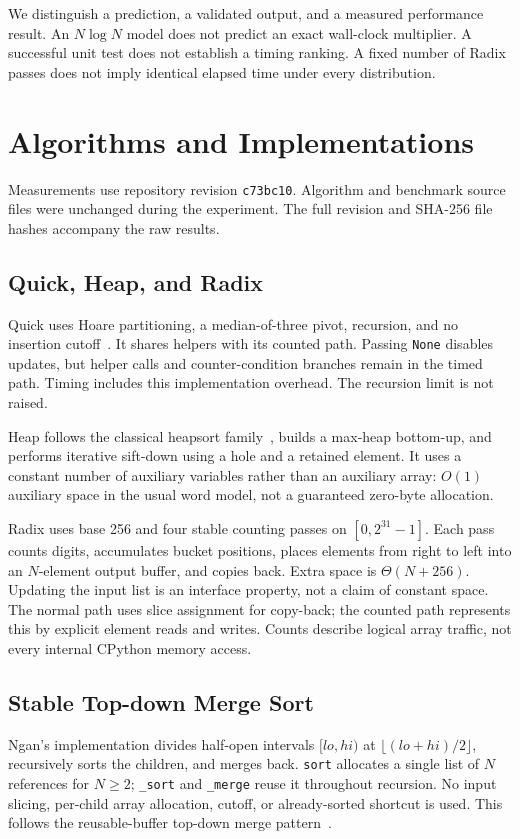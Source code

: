 \documentclass[conference]{IEEEtran}
\begin{document}
We distinguish a prediction, a validated output, and a measured performance result. An $N\log N$ model does not predict an exact wall-clock multiplier. A successful unit test does not establish a timing ranking. A fixed number of Radix passes does not imply identical elapsed time under every distribution.

\section{Algorithms and Implementations}
Measurements use repository revision \texttt{c73bc10}. Algorithm and benchmark source files were unchanged during the experiment. The full revision and SHA-256 file hashes accompany the raw results.

\subsection{Quick, Heap, and Radix}
Quick uses Hoare partitioning, a median-of-three pivot, recursion, and no insertion cutoff~\cite{hoare}. It shares helpers with its counted path. Passing \texttt{None} disables updates, but helper calls and counter-condition branches remain in the timed path. Timing includes this implementation overhead. The recursion limit is not raised.

Heap follows the classical heapsort family~\cite{williams}, builds a max-heap bottom-up, and performs iterative sift-down using a hole and a retained element. It uses a constant number of auxiliary variables rather than an auxiliary array: $O(1)$ auxiliary space in the usual word model, not a guaranteed zero-byte allocation.

Radix uses base 256 and four stable counting passes on $[0,2^{31}-1]$. Each pass counts digits, accumulates bucket positions, places elements from right to left into an $N$-element output buffer, and copies back. Extra space is $\Theta(N+256)$. Updating the input list is an interface property, not a claim of constant space. The normal path uses slice assignment for copy-back; the counted path represents this by explicit element reads and writes. Counts describe logical array traffic, not every internal CPython memory access.

\subsection{Stable Top-down Merge Sort}
Ngan's implementation divides half-open intervals $[lo,hi)$ at $\lfloor(lo+hi)/2\rfloor$, recursively sorts the children, and merges back. \texttt{sort} allocates a single list of $N$ references for $N\geq2$; \texttt{\_sort} and \texttt{\_merge} reuse it throughout recursion. No input slicing, per-child array allocation, cutoff, or already-sorted shortcut is used. This follows the reusable-buffer top-down merge pattern~\cite{merge}.
\end{document}
